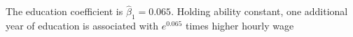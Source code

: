 The education coefficient is $\hat{\beta}_1=0.065$. Holding ability constant, one additional year of education is associated with $e^{0.065}$ times higher hourly wage 
